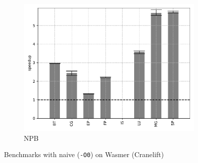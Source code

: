 \begin{figure}
\begin{subfigure}[t]{.45\textwidth}
        \includegraphics[width=\textwidth]
        {Images/6.1.RQ1/npb-wasmer-cranelift-naive.pdf}
        \caption{NPB}
    \end{subfigure}
    \caption{Benchmarks with naive (\texttt{-O0}) on Wasmer (Cranelift)}
    \label{fig:rq1-wasmer-cranelift-naive}
\end{figure}

